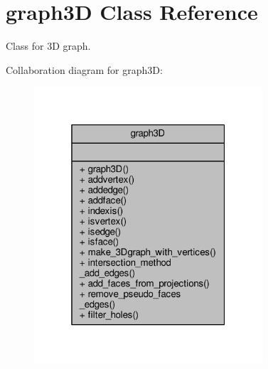 \hypertarget{classgraph3D}{}\section{graph3D Class Reference}
\label{classgraph3D}


Class for 3D graph.  




Collaboration diagram for graph3D\+:\nopagebreak
\begin{figure}[H]
\begin{center}
\leavevmode
\includegraphics[width=241pt]{classgraph3D__coll__graph}
\end{center}
\end{figure}
